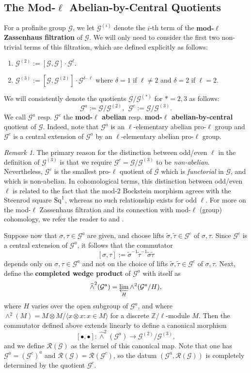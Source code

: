\documentclass[11pt]{amsart}
\theoremstyle{definition}
\theoremstyle{remark}
\newtheorem{remark}[proposition]{Remark}
\numberwithin{equation}{section}
\newcommand{\Z}{\mathbb{Z}}
\newcommand{\Gc}{\mathcal{G}}
\newcommand{\Rcal}{\mathcal{R}}
\begin{document}
\subsection{The Mod-$\ell$ Abelian-by-Central Quotients}
\label{subsection: intro / mod-ell-category}

For a profinite group $\Gc$, we let $\Gc^{(i)}$ denote the $i$-th term of the {\bf mod-$\ell$ Zassenhaus filtration} of $\Gc$.
We will only need to consider the first two non-trivial terms of this filtration, which are defined explicitly as follows:
\begin{enumerate}
  \item $\Gc^{(2)} := [\Gc,\Gc] \cdot \Gc^\ell$.
  \item $\Gc^{(3)} := [\Gc,\Gc^{(2)}] \cdot \Gc^{\delta \cdot \ell}$ where $\delta = 1$ if $\ell \neq 2$ and $\delta = 2$ if $\ell = 2$.
\end{enumerate}
We will consistently denote the quotients $\Gc/\Gc^{(*)}$ for $* = 2,3$ as follows:
\[ \Gc^a := \Gc/\Gc^{(2)}, \ \ \Gc^c := \Gc/\Gc^{(3)}. \]
We call $\Gc^a$ resp. $\Gc^c$ the {\bf mod-$\ell$ abelian} resp. {\bf mod-$\ell$ abelian-by-central} quotient of $\Gc$.
Indeed, note that $\Gc^a$ is an $\ell$-elementary abelian pro-$\ell$ group and $\Gc^c$ is a central extension of $\Gc^a$ by an $\ell$-elementary abelian pro-$\ell$ group.

\begin{remark}
  The primary reason for the distinction between odd/even $\ell$ in the definition of $\Gc^{(3)}$ is that we require $\Gc^c = \Gc/\Gc^{(3)}$ to be \emph{non-abelian}.
  Nevertheless, $\Gc^c$ is the smallest pro-$\ell$ quotient of $\Gc$ which is \emph{functorial} in $\Gc$, and which is non-abelian.
  In cohomological terms, this distinction between odd/even $\ell$ is related to the fact that the mod-$2$ Bockstein morphism agrees with the Steenrod square ${\rm Sq}^1$, whereas no such relationship exists for odd $\ell$.
  For more on the mod-$\ell$ Zassenhaus filtration and its connection with mod-$\ell$ (group) cohomology, we refer the reader to \cite{Efrat:2014} and \cite{Efrat:2015}.
\end{remark}

Suppose now that $\sigma,\tau \in \Gc^a$ are given, and choose lifts $\tilde\sigma,\tilde\tau \in \Gc^c$ of $\sigma,\tau$.
Since $\Gc^c$ is a central extension of $\Gc^a$, it follows that the commutator
\[ [\sigma,\tau] := \tilde\sigma^{-1}\tilde\tau^{-1}\tilde\sigma\tilde\tau \]
depends only on $\sigma,\tau \in \Gc^a$ and not on the choice of lifts $\tilde\sigma,\tilde\tau \in \Gc^c$ of $\sigma,\tau$.
Next, define the {\bf completed wedge product} of $\Gc^a$ with itself as 
\[ \widehat\wedge^2 (\Gc^a) = \varprojlim_H \wedge^2(\Gc^a/H), \]
where $H$ varies over the open subgroup of $\Gc^a$, and where $\wedge^2 (M) = M \otimes M/\langle x \otimes x : x \in M \rangle$ for a discrete $\Z/\ell$-module $M$.
Then the commutator defined above extends linearly to define a canonical morphism 
\[ [\bullet,\bullet] : \widehat\wedge^2(\Gc^a) \rightarrow \Gc^{(2)}/\Gc^{(3)}, \]
and we define $\Rcal(\Gc)$ as the kernel of this canonical map.
Note that one has $\Gc^a = (\Gc^c)^a$ and $\Rcal(\Gc) = \Rcal(\Gc^c)$, so the datum $(\Gc^a,\Rcal(\Gc))$ is completely determined by the quotient $\Gc^c$.
\end{document}
